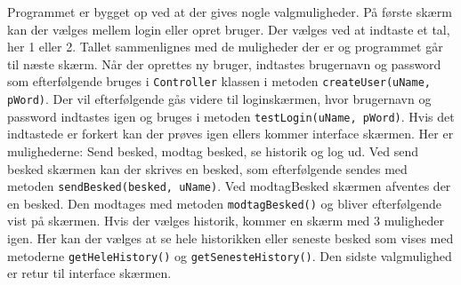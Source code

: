 Programmet er bygget op ved at der gives nogle valgmuligheder. På første skærm kan der vælges mellem login eller opret bruger. Der vælges ved at indtaste et tal, her 1 eller 2. Tallet sammenlignes med de muligheder der er og programmet går til næste skærm. Når der oprettes ny bruger, indtastes brugernavn og password som efterfølgende bruges i \texttt{Controller} klassen i metoden \texttt{createUser(uName, pWord)}. Der vil efterfølgende gås videre til loginskærmen, hvor brugernavn og password indtastes igen og bruges i metoden \texttt{testLogin(uName, pWord)}. Hvis det indtastede er forkert kan der prøves igen ellers kommer interface skærmen. Her er mulighederne: Send besked, modtag besked, se historik og log ud. Ved send besked skærmen kan der skrives en besked, som efterfølgende sendes med metoden \texttt{sendBesked(besked, uName)}. Ved modtagBesked skærmen afventes der en besked. Den modtages med metoden \texttt{modtagBesked()} og bliver efterfølgende vist på skærmen. Hvis der vælges historik, kommer en skærm med 3 muligheder igen. Her kan der vælges at se hele historikken eller seneste besked som vises med metoderne \texttt{getHeleHistory()} og \texttt{getSenesteHistory()}. Den sidste valgmulighed er retur til interface skærmen.